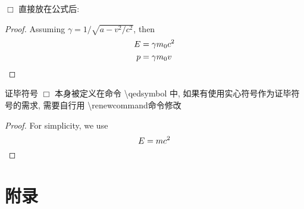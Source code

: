 \documentclass[a4paper]{ctexart}
\begin{document}
    $\Box$ 直接放在公式后:
    \begin{proof}
        Assuming $\gamma = 1/\sqrt{a-v^2/c^2}$, then
        \begin{equation}
            \begin{aligned}
                E & = \gamma m_0 c^2 \\ 
                p & = \gamma m_0 v \qedhere
            \end{aligned}
        \end{equation}
    \end{proof}
    证毕符号 $\Box$ 本身被定义在命令 \textbackslash qedsymbol 中,%
    如果有使用实心符号作为证毕符号的需求, 需要自行用%
    \textbackslash renewcommand命令修改
    \renewcommand{\qedsymbol}{\rule{1ex}{1.5ex}}
    \renewcommand{\proofname}{\textit{Proof}}    
    \begin{proof}
        For simplicity, we use
        \[ E=mc^2 \qedhere \]
    \end{proof}
    \newpage
    \appendix
    \section{附录}
\end{document}
